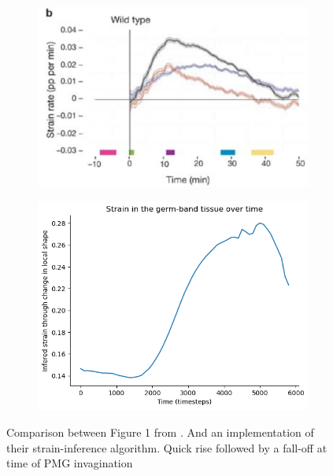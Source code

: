 \begin{figure}[H]
    \centering
    \begin{subfigure}{0.45\linewidth}
        \centering
        \includegraphics[width = \linewidth]{chapters/Results/figures/strain_rate_extrinsic.png}
    \end{subfigure}
        \begin{subfigure}{0.45\linewidth}
        \centering
        \includegraphics[width = \linewidth]{chapters/Results/figures/strain_smoothedpng.png}
    \end{subfigure}
    \caption{Comparison between Figure 1 from \cite{butler2009cell}. And an implementation of their strain-inference algorithm. Quick rise followed by a fall-off at time of PMG invagination\\}
    \label{fig:strain}
\end{figure}



